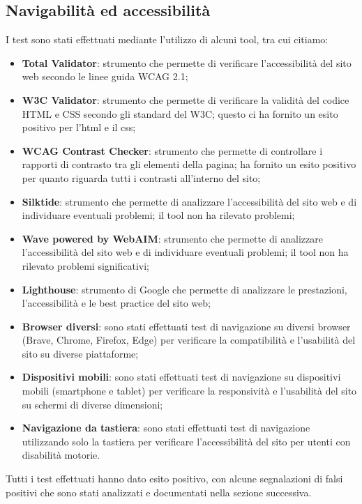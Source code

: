 \documentclass[11pt,a4paper]{article}
\begin{document}
\subsection{Navigabilità ed accessibilità}
I test sono stati effettuati mediante l'utilizzo di alcuni tool, tra cui citiamo:
\begin{itemize}
    \item \textbf{Total Validator}: strumento che permette di verificare l'accessibilità del sito web secondo le linee guida WCAG 2.1;
    \item \textbf{W3C Validator}: strumento che permette di verificare la validità del codice HTML e CSS secondo gli standard del W3C; questo ci ha fornito un esito positivo per l'html e il css;   
    \item \textbf{WCAG Contrast Checker}: strumento che permette di controllare i rapporti di contrasto tra gli elementi della pagina; ha fornito un esito positivo per quanto riguarda tutti i contrasti all'interno del sito;
    \item \textbf{Silktide}: strumento che permette di analizzare l'accessibilità del sito web e di individuare eventuali problemi; il tool non ha rilevato problemi;
    \item \textbf{Wave powered by WebAIM}: strumento che permette di analizzare l'accessibilità del sito web e di individuare eventuali problemi; il tool non ha rilevato problemi significativi;
    \item \textbf{Lighthouse}: strumento di Google che permette di analizzare le prestazioni, l'accessibilità e le best practice del sito web;
    \item \textbf{Browser diversi}: sono stati effettuati test di navigazione su diversi browser (Brave, Chrome, Firefox, Edge) per verificare la compatibilità e l'usabilità del sito su diverse piattaforme;
    \item \textbf{Dispositivi mobili}: sono stati effettuati test di navigazione su dispositivi mobili (smartphone e tablet) per verificare la responsività e l'usabilità del sito su schermi di diverse dimensioni;
    \item \textbf{Navigazione da tastiera}: sono stati effettuati test di navigazione utilizzando solo la tastiera per verificare l'accessibilità del sito per utenti con disabilità motorie.
\end{itemize}
Tutti i test effettuati hanno dato esito positivo, con alcune segnalazioni di falsi positivi che sono stati analizzati e documentati nella sezione successiva.
\end{document}
